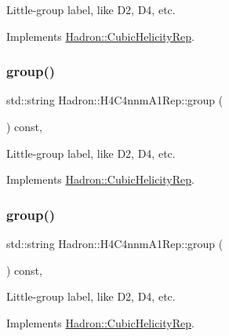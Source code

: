Little-\/group label, like D2, D4, etc. 

Implements \mbox{\hyperlink{structHadron_1_1CubicHelicityRep_a101a7d76cd8ccdad0f272db44b766113}{Hadron\+::\+Cubic\+Helicity\+Rep}}.

\mbox{\label{structHadron_1_1H4C4nnmA1Rep_a6434db04654db0e72689cb23155ce5c7}} 
\subsubsection{\texorpdfstring{group()}{group()}\hspace{0.1cm}{\footnotesize\ttfamily [3/5]}}
{\footnotesize\ttfamily std\+::string Hadron\+::\+H4\+C4nnm\+A1\+Rep\+::group (\begin{DoxyParamCaption}{ }\end{DoxyParamCaption}) const\hspace{0.3cm}{\ttfamily [inline]}, {\ttfamily [virtual]}}

Little-\/group label, like D2, D4, etc. 

Implements \mbox{\hyperlink{structHadron_1_1CubicHelicityRep_a101a7d76cd8ccdad0f272db44b766113}{Hadron\+::\+Cubic\+Helicity\+Rep}}.

\mbox{\label{structHadron_1_1H4C4nnmA1Rep_a6434db04654db0e72689cb23155ce5c7}} 
\subsubsection{\texorpdfstring{group()}{group()}\hspace{0.1cm}{\footnotesize\ttfamily [4/5]}}
{\footnotesize\ttfamily std\+::string Hadron\+::\+H4\+C4nnm\+A1\+Rep\+::group (\begin{DoxyParamCaption}{ }\end{DoxyParamCaption}) const\hspace{0.3cm}{\ttfamily [inline]}, {\ttfamily [virtual]}}

Little-\/group label, like D2, D4, etc. 

Implements \mbox{\hyperlink{structHadron_1_1CubicHelicityRep_a101a7d76cd8ccdad0f272db44b766113}{Hadron\+::\+Cubic\+Helicity\+Rep}}.

